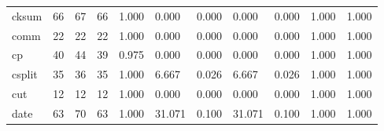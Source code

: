 \begin{longtable}{lp{1.8cm}p{1.8cm}p{1.8cm}p{1.8cm}p{1.8cm}p{1.8cm}p{1.8cm}p{1.8cm}p{1.8cm}p{1.8cm}}
cksum     &                           66 &                 67 &                                66 &                                      1.000 &                                  0.000 &                                        0.000 &                             0.000 &                                   0.000 &                              1.000 &                                              1.000 \\
comm      &                           22 &                 22 &                                22 &                                      1.000 &                                  0.000 &                                        0.000 &                             0.000 &                                   0.000 &                              1.000 &                                              1.000 \\
cp        &                           40 &                 44 &                                39 &                                      0.975 &                                  0.000 &                                        0.000 &                             0.000 &                                   0.000 &                              1.000 &                                              1.000 \\
csplit    &                           35 &                 36 &                                35 &                                      1.000 &                                  6.667 &                                        0.026 &                             6.667 &                                   0.026 &                              1.000 &                                              1.000 \\
cut       &                           12 &                 12 &                                12 &                                      1.000 &                                  0.000 &                                        0.000 &                             0.000 &                                   0.000 &                              1.000 &                                              1.000 \\
date      &                           63 &                 70 &                                63 &                                      1.000 &                                 31.071 &                                        0.100 &                            31.071 &                                   0.100 &                              1.000 &                                              1.000 \\

\end{longtable}

